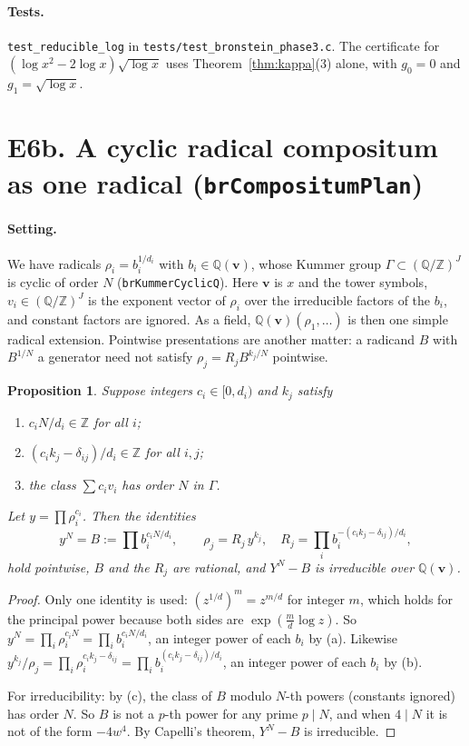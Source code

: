 \documentclass[11pt]{article}
\newtheorem{proposition}[theorem]{Proposition}
\theoremstyle{definition}
\theoremstyle{remark}
\newcommand{\Q}{\mathbb{Q}}
\newcommand{\Z}{\mathbb{Z}}
\newcommand{\code}[1]{\texttt{#1}}
\begin{document}
\paragraph{Tests.} \code{test\_reducible\_log} in
\code{tests/test\_bronstein\_phase3.c}. The certificate for
$(\log x^2-2\log x)\sqrt{\log x}$ uses Theorem~\ref{thm:kappa}(3) alone, with
$g_0=0$ and $g_1=\sqrt{\log x}$.

\section*{E6b. A cyclic radical compositum as one radical (\code{brCompositumPlan})}

\paragraph{Setting.} We have radicals $\rho_i=b_i^{1/d_i}$ with
$b_i\in\Q(\mathbf v)$, whose Kummer group $\Gamma\subset(\Q/\Z)^J$ is cyclic
of order $N$ (\code{brKummerCyclicQ}). Here $\mathbf v$ is $x$ and the tower
symbols, $v_i\in(\Q/\Z)^J$ is the exponent vector of $\rho_i$ over the
irreducible factors of the $b_i$, and constant factors are ignored. As a field,
$\Q(\mathbf v)(\rho_1,\dots)$ is then one simple radical extension. Pointwise
presentations are another matter: a radicand $B$ with $B^{1/N}$ a generator need
not satisfy $\rho_j=R_jB^{k_j/N}$ pointwise.

\begin{proposition}
Suppose integers $c_i\in[0,d_i)$ and $k_j$ satisfy
\begin{enumerate}
\item[(a)] $c_iN/d_i\in\Z$ for all $i$;
\item[(b)] $(c_ik_j-\delta_{ij})/d_i\in\Z$ for all $i,j$;
\item[(c)] the class $\sum c_iv_i$ has order $N$ in $\Gamma$.
\end{enumerate}
Let $y=\prod\rho_i^{c_i}$. Then the identities
\[ y^N=B:=\prod b_i^{c_iN/d_i},\qquad \rho_j=R_j\,y^{k_j},\quad
   R_j=\prod_i b_i^{-(c_ik_j-\delta_{ij})/d_i}, \]
hold \emph{pointwise}, $B$ and the $R_j$ are rational, and $Y^N-B$ is
irreducible over $\Q(\mathbf v)$.
\end{proposition}

\begin{proof}
Only one identity is used: $(z^{1/d})^m=z^{m/d}$ for integer $m$, which holds
for the principal power because both sides are $\exp(\tfrac md\log z)$. So
$y^N=\prod_i\rho_i^{c_iN}=\prod_ib_i^{c_iN/d_i}$, an integer power of each
$b_i$ by (a). Likewise
$y^{k_j}/\rho_j=\prod_i\rho_i^{c_ik_j-\delta_{ij}}=\prod_ib_i^{(c_ik_j-\delta_{ij})/d_i}$,
an integer power of each $b_i$ by (b).

For irreducibility: by (c), the class of $B$ modulo $N$-th powers (constants
ignored) has order $N$. So $B$ is not a $p$-th power for any prime $p\mid N$,
and when $4\mid N$ it is not of the form $-4w^4$. By Capelli's theorem,
$Y^N-B$ is irreducible.
\end{proof}
\end{document}
